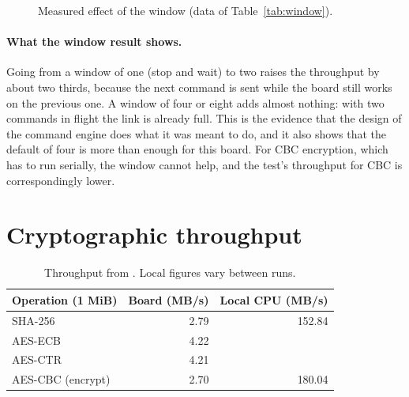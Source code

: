 \begin{figure}[ht]
\centering
{}
\caption{Measured effect of the window (data of Table~\ref{tab:window}).}
\end{figure}

\paragraph{What the window result shows.} Going from a window of one (stop and wait) to two raises the throughput by about two thirds, because the next command is sent while the board still works on the previous one. A window of four or eight adds almost nothing: with two commands in flight the link is already full. This is the evidence that the design of the command engine does what it was meant to do, and it also shows that the default of four is more than enough for this board. For CBC encryption, which has to run serially, the window cannot help, and the test's throughput for CBC is correspondingly lower.

\section{Cryptographic throughput}

\begin{table}[ht]
\centering
\begin{tabular}{lrr}
\toprule
Operation (1 MiB) & Board (MB/s) & Local CPU (MB/s) \\
\midrule
SHA-256 & 2.79 & 152.84 \\
AES-ECB & 4.22 & \\
AES-CTR & 4.21 & \\
AES-CBC (encrypt) & 2.70 & 180.04 \\
\bottomrule
\end{tabular}
\caption{Throughput from . Local figures vary between runs.}
\end{table}

